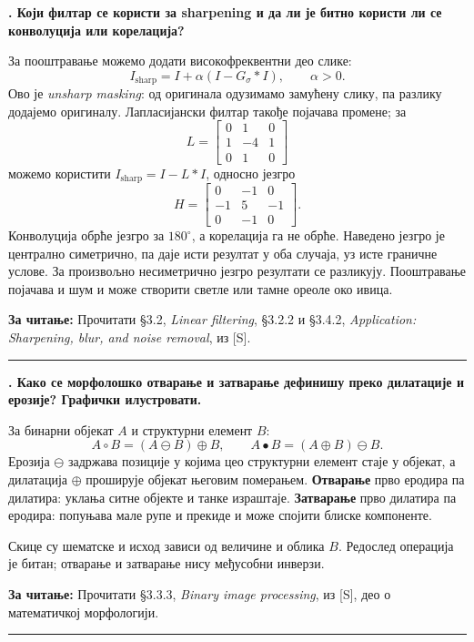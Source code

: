\documentclass[10pt,a4paper]{article}
\newcommand{\en}[1]{\textit{#1}}
\newcounter{pitanje}
\newenvironment{odgovor}[1]{\stepcounter{pitanje}\begin{minipage}[t][0.455\textheight][t]{\textwidth}\vspace{0pt}\textbf{\thepitanje. #1}\par\smallskip}{\end{minipage}\par\ifodd\value{pitanje}\vspace{0.025\textheight}\hrule\vspace{0.015\textheight}\else\newpage\fi}
\newcommand{\izvor}[1]{\par\vfill{\footnotesize\textbf{За читање:} #1}\par}
\begin{document}
\begin{odgovor}{Који филтар се користи за sharpening и да ли је битно користи ли се конволуција или корелација?}
За пооштравање можемо додати високофреквентни део слике:
\[
I_{\mathrm{sharp}}=I+\alpha(I-G_\sigma*I),\qquad \alpha>0.
\]
Ово је \en{unsharp masking}: од оригинала одузимамо замућену слику, па разлику додајемо оригиналу. Лапласијански филтар такође појачава промене; за
\[
L=\begin{bmatrix}0&1&0\\1&-4&1\\0&1&0\end{bmatrix}
\]
можемо користити $I_{\mathrm{sharp}}=I-L*I$, односно језгро
\[
H=\begin{bmatrix}0&-1&0\\-1&5&-1\\0&-1&0\end{bmatrix}.
\]
Конволуција обрће језгро за $180^\circ$, а корелација га не обрће. Наведено језгро је централно симетрично, па даје исти резултат у оба случаја, уз исте граничне услове. За произвољно несиметрично језгро резултати се разликују. Пооштравање појачава и шум и може створити светле или тамне ореоле око ивица.
\izvor{Прочитати §3.2, \en{Linear filtering}, §3.2.2 и §3.4.2, \en{Application: Sharpening, blur, and noise removal}, из [S].}
\end{odgovor}

\begin{odgovor}{Како се морфолошко отварање и затварање дефинишу преко дилатације и ерозије? Графички илустровати.}
За бинарни објекат $A$ и структурни елемент $B$:
\[
A\circ B=(A\ominus B)\oplus B,\qquad A\bullet B=(A\oplus B)\ominus B.
\]
Ерозија $\ominus$ задржава позиције у којима цео структурни елемент стаје у објекат, а дилатација $\oplus$ проширује објекат његовим померањем. \textbf{Отварање} прво еродира па дилатира: уклања ситне објекте и танке израштаје. \textbf{Затварање} прво дилатира па еродира: попуњава мале рупе и прекиде и може спојити блиске компоненте.
\begin{center}\end{center}
Скице су шематске и исход зависи од величине и облика $B$. Редослед операција је битан; отварање и затварање нису међусобни инверзи.
\izvor{Прочитати §3.3.3, \en{Binary image processing}, из [S], део о математичкој морфологији.}
\end{odgovor}
\end{document}
